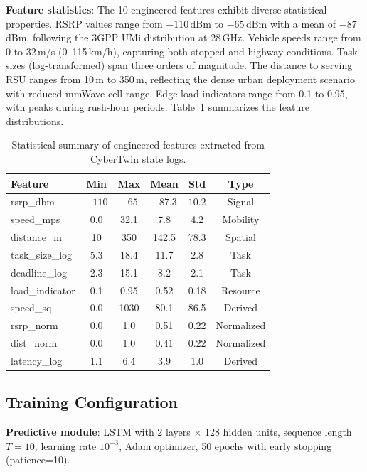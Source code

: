 \documentclass[journal,twoside]{IEEEtran}
\begin{document}
\textbf{Feature statistics}: The 10 engineered features exhibit diverse statistical properties. RSRP values range from $-110$\,dBm to $-65$\,dBm with a mean of $-87$\,dBm, following the 3GPP UMi distribution at 28\,GHz. Vehicle speeds range from 0 to 32\,m/s (0--115\,km/h), capturing both stopped and highway conditions. Task sizes (log-transformed) span three orders of magnitude. The distance to serving RSU ranges from 10\,m to 350\,m, reflecting the dense urban deployment scenario with reduced mmWave cell range. Edge load indicators range from 0.1 to 0.95, with peaks during rush-hour periods. Table~\ref{tab:feature_stats} summarizes the feature distributions.

\begin{table}[t]
\centering
\caption{Statistical summary of engineered features extracted from CyberTwin state logs.}
\label{tab:feature_stats}
\small
\begin{tabular}{lccccc}
\toprule
\textbf{Feature} & \textbf{Min} & \textbf{Max} & \textbf{Mean} & \textbf{Std} & \textbf{Type} \\
\midrule
rsrp\_dbm & $-110$ & $-65$ & $-87.3$ & $10.2$ & Signal \\
speed\_mps & 0.0 & 32.1 & 7.8 & 4.2 & Mobility \\
distance\_m & 10 & 350 & 142.5 & 78.3 & Spatial \\
task\_size\_log & 5.3 & 18.4 & 11.7 & 2.8 & Task \\
deadline\_log & 2.3 & 15.1 & 8.2 & 2.1 & Task \\
load\_indicator & 0.1 & 0.95 & 0.52 & 0.18 & Resource \\
speed\_sq & 0.0 & 1030 & 80.1 & 86.5 & Derived \\
rsrp\_norm & 0.0 & 1.0 & 0.51 & 0.22 & Normalized \\
dist\_norm & 0.0 & 1.0 & 0.41 & 0.22 & Normalized \\
latency\_log & 1.1 & 6.4 & 3.9 & 1.0 & Derived \\
\bottomrule
\end{tabular}
\end{table}

\subsection{Training Configuration}

\textbf{Predictive module}: LSTM with 2 layers $\times$ 128 hidden units, sequence length $T=10$, learning rate $10^{-3}$, Adam optimizer, 50 epochs with early stopping (patience=10).
\end{document}
